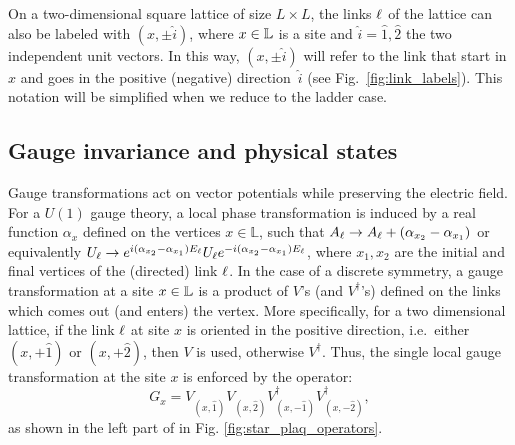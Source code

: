 On a  two-dimensional square lattice of size $L \times L$, the links $\ell$ of the lattice can also be labeled with $(x, \pm\hat{i})$, where $x \in \mathbb{L}$ is a site and
$\hat{i}=\hat{1}, \hat{2}$ the two independent unit vectors.
In this way, $(x, \pm\hat{i})$ will refer to the link that start in $x$ and goes in the positive (negative) direction~$\hat{i}$ (see Fig.~\ref{fig:link_labels}).
This notation will be simplified when we reduce to the ladder case.


\begin{figure}
\end{figure}


\subsection{Gauge invariance and physical states}%
\label{sub:gauge_invariance}

Gauge transformations act on vector potentials while preserving the electric field.
For a $U(1)$ gauge theory, a local phase transformation is induced by a real function $\alpha_x$
defined on the vertices $x\in \mathbb L$, such that  $A_{\ell} \rightarrow A_{\ell} + (\alpha_{x_2} - \alpha_{x_1})$ or equivalently $U_{\ell} \rightarrow  e^{i(\alpha_{x_2} - \alpha_{x_1})
E_{\ell}}  U_{\ell}   e^{-i(\alpha_{x_2} - \alpha_{x_1} )E_{\ell}} $, where $x_1,x_2$ are the initial and final vertices of the (directed) link $\ell$.
In the case of a discrete symmetry, a gauge transformation at a site $x \in \mathbb{L}$ is a product of $V$'s (and $V^\dagger$'s) defined on the links which comes out (and enters) the vertex.
More specifically, for a two dimensional lattice,
if the link $\ell$ at site $x$ is oriented in the positive direction, i.e.~either $(x, +\hat{1})$ or $(x, +\hat{2})$, then $V$ is used, otherwise $V^\dagger$.
Thus,
the single local gauge transformation at the site $x$ is enforced by the operator:
\begin{equation}
    G_x =
    V_{(x, \hat{1})}^{\phantom{\dagger}}
    V_{(x, \hat{2})}^{\phantom{\dagger}}
    V^\dagger_{(x, -\hat{1})}
    V^\dagger_{(x, -\hat{2})},
    \label{eq:gauss_operator}
\end{equation}
as shown in the left part of in Fig. \ref{fig:star_plaq_operators}.

